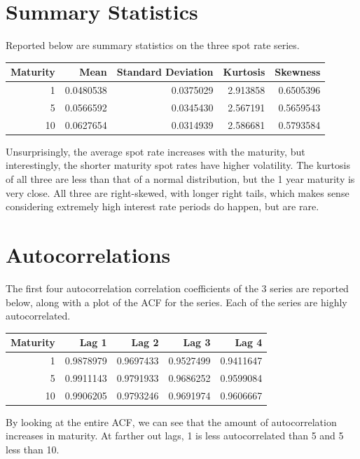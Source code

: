 \documentclass[]{book}
\theoremstyle{definition}
\theoremstyle{definition}
\theoremstyle{definition}
\theoremstyle{remark}
\begin{document}
\hypertarget{summary-statistics}{%
\section{Summary Statistics}\label{summary-statistics}}

Reported below are summary statistics on the three spot rate series.

\begin{tabular}{rrrrr}
\toprule
Maturity & Mean & Standard Deviation & Kurtosis & Skewness\\
\midrule
1 & 0.0480538 & 0.0375029 & 2.913858 & 0.6505396\\
5 & 0.0566592 & 0.0345430 & 2.567191 & 0.5659543\\
10 & 0.0627654 & 0.0314939 & 2.586681 & 0.5793584\\
\bottomrule
\end{tabular}

Unsurprisingly, the average spot rate increases with the maturity, but
interestingly, the shorter maturity spot rates have higher volatility.
The kurtosis of all three are less than that of a normal distribution,
but the 1 year maturity is very close. All three are right-skewed, with
longer right tails, which makes sense considering extremely high
interest rate periods do happen, but are rare.

\hypertarget{autocorrelations}{%
\section{Autocorrelations}\label{autocorrelations}}

The first four autocorrelation correlation coefficients of the 3 series
are reported below, along with a plot of the ACF for the series. Each of
the series are highly autocorrelated.

\begin{tabular}{r|r|r|r|r}
\hline
Maturity & Lag 1 & Lag 2 & Lag 3 & Lag 4\\
\hline
1 & 0.9878979 & 0.9697433 & 0.9527499 & 0.9411647\\
\hline
5 & 0.9911143 & 0.9791933 & 0.9686252 & 0.9599084\\
\hline
10 & 0.9906205 & 0.9793246 & 0.9691974 & 0.9606667\\
\hline
\end{tabular}

By looking at the entire ACF, we can see that the amount of
autocorrelation increases in maturity. At farther out lags, 1 is less
autocorrelated than 5 and 5 less than 10.
\end{document}

